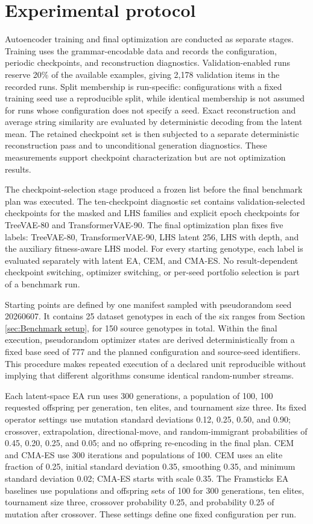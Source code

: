 \section{Experimental protocol}

Autoencoder training and final optimization are conducted as separate stages. Training uses the grammar-encodable \fone{} data and records the configuration, periodic checkpoints, and reconstruction diagnostics. Validation-enabled runs reserve 20\% of the available examples, giving 2,178 validation items in the recorded runs. Split membership is run-specific: configurations with a fixed training seed use a reproducible split, while identical membership is not assumed for runs whose configuration does not specify a seed. Exact reconstruction and average string similarity are evaluated by deterministic decoding from the latent mean. The retained checkpoint set is then subjected to a separate deterministic reconstruction pass and to unconditional generation diagnostics. These measurements support checkpoint characterization but are not optimization results.

The checkpoint-selection stage produced a frozen list before the final benchmark plan was executed. The ten-checkpoint diagnostic set contains validation-selected checkpoints for the masked and LHS families and explicit epoch checkpoints for TreeVAE-80 and TransformerVAE-90. The final optimization plan fixes five labels: TreeVAE-80, TransformerVAE-90, LHS latent 256, LHS with depth, and the auxiliary fitness-aware LHS model. For every starting genotype, each label is evaluated separately with latent EA, CEM, and CMA-ES. No result-dependent checkpoint switching, optimizer switching, or per-seed portfolio selection is part of a benchmark run.

Starting points are defined by one manifest sampled with pseudorandom seed 20260607. It contains 25 dataset genotypes in each of the six ranges from Section \ref{sec:Benchmark setup}, for 150 source genotypes in total. 
Within the final execution, pseudorandom optimizer states are derived deterministically from a fixed base seed of 777 and the planned configuration and source-seed identifiers. This procedure makes repeated execution of a declared unit reproducible without implying that different algorithms consume identical random-number streams.

Each latent-space EA run uses 300 generations, a population of 100, 100 requested offspring per generation, ten elites, and tournament size three. Its fixed operator settings use mutation standard deviations 0.12, 0.25, 0.50, and 0.90; crossover, extrapolation, directional-move, and random-immigrant probabilities of 0.45, 0.20, 0.25, and 0.05; and no offspring re-encoding in the final plan. CEM and CMA-ES use 300 iterations and populations of 100. CEM uses an elite fraction of 0.25, initial standard deviation 0.35, smoothing 0.35, and minimum standard deviation 0.02; CMA-ES starts with scale 0.35. The Framsticks EA baselines use populations and offspring sets of 100 for 300 generations, ten elites, tournament size three, crossover probability 0.25, and probability 0.25 of mutation after crossover. These settings define one fixed configuration per run.

